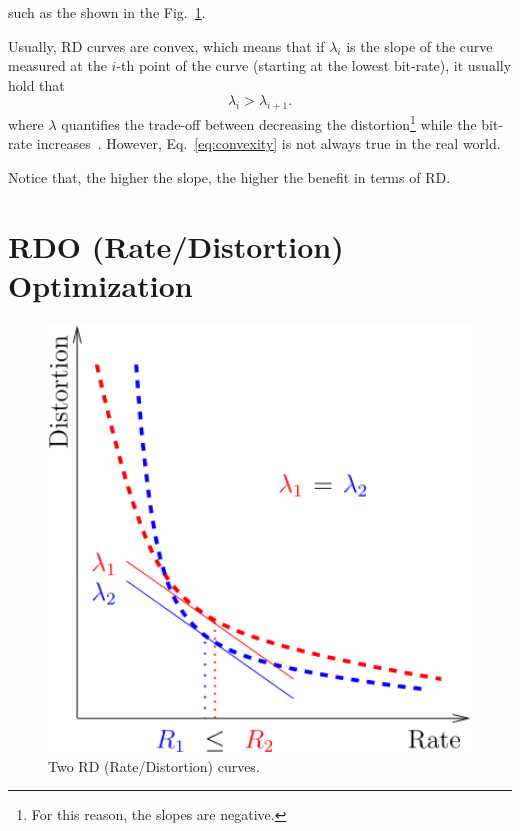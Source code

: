 such as the shown in the
Fig.~\ref{fig:RD_slopes}.

Usually, RD curves are convex, which means
that if $\lambda_i$ is the slope of the curve measured at the $i$-th
point of the curve (starting at the lowest bit-rate), it usually hold
that
\begin{equation}
  \lambda_i > \lambda_{i+1}.
  \label{eq:convexity}
\end{equation}
where $\lambda$ quantifies the trade-off between decreasing the
distortion\footnote{For this reason, the slopes are negative.} while
the bit-rate
increases~\cite{vetterli1995wavelets,sayood2017introduction}. However,
Eq.~\eqref{eq:convexity} is not always true in the real world.

Notice that, the higher the slope, the higher the benefit in terms of RD.


\section{RDO (Rate/Distortion) Optimization}

\begin{figure}
  \centering
  \includegraphics[width=1.0\textwidth]{graphics/RD_slopes} 
  \caption{Two RD (Rate/Distortion) curves.}
  \label{fig:RD_slopes}
\end{figure}

